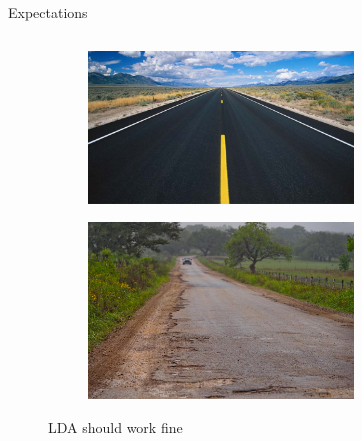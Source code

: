 \documentclass{beamer}
\begin{document}
	\begin{frame}[t]{Expectations}
	 \begin{columns}
      \begin{column}{0.48\textwidth}
        \begin{figure}[t]
	  	 \begin{subfigure}{1.\textwidth}
  		  \includegraphics[width=1.\linewidth]{LDA_perfect.jpeg}
 	     \end{subfigure}
 	     \begin{subfigure}{1.\textwidth}
  		  \includegraphics[width=1.\linewidth]{LDA_works.jpeg}  
 	     \end{subfigure}
	     \caption{LDA should work fine}
	    \end{figure}
      \end{column}\pause
      \begin{column}{0.48\textwidth}
        \begin{figure}[t]
	  	 \begin{subfigure}{.9\textwidth}

\end{subfigure}
\end{figure}
\end{column}
\end{columns}
\end{frame}
\end{document}
